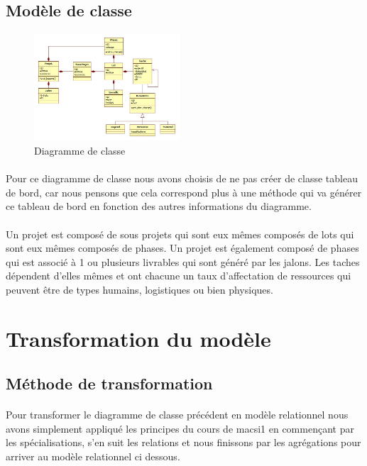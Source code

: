 \documentclass[a4paper, 12pt]{article}
\begin{document}
\subsection{Modèle de classe}

\begin{figure}[h!]
	\centering
	\includegraphics[height=4cm]{diagramme_de_classe.jpg}
	\caption{Diagramme de classe}
\end{figure}
\paragraph{}Pour ce diagramme de classe nous avons choisis de ne pas créer de classe tableau de bord, car nous pensons que cela correspond plus à une méthode qui va générer ce tableau de bord en fonction des autres informations du diagramme.
\paragraph{}Un projet est composé de sous projets qui sont eux mêmes composés de lots qui sont eux mêmes composés de phases. Un projet est également composé de phases qui est associé à 1 ou plusieurs livrables qui sont généré par les jalons. Les taches dépendent d'elles mêmes et ont chacune un taux d'affectation de ressources qui peuvent être de types humains, logistiques ou bien physiques.

\newpage

\section{Transformation du modèle}
\subsection{Méthode de transformation}
\paragraph{}Pour transformer le diagramme de classe précédent en modèle relationnel nous avons simplement appliqué les principes du cours de macsi1 en commençant par les spécialisations, s'en suit les relations et nous finissons par les agrégations pour arriver au modèle relationnel ci dessous.
\end{document}
